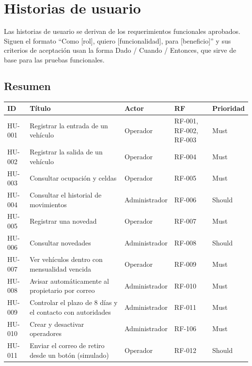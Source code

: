 
\chapter{Historias de usuario}\label{cap:historias}

Las historias de usuario se derivan de los requerimientos funcionales aprobados. Siguen el formato ``Como [rol], quiero [funcionalidad], para [beneficio]'' y sus criterios de aceptación usan la forma Dado / Cuando / Entonces, que sirve de base para las pruebas funcionales.

\section{Resumen}
\begin{longtable}{>{\raggedright\arraybackslash}p{1.5cm}>{\raggedright\arraybackslash}p{5.2cm}>{\raggedright\arraybackslash}p{2.6cm}>{\raggedright\arraybackslash}p{3.0cm}>{\raggedright\arraybackslash}p{1.9cm}}
\toprule
\textbf{ID} & \textbf{Título} & \textbf{Actor} & \textbf{RF} & \textbf{Prioridad}\\
\midrule\endhead
HU-001 & Registrar la entrada de un vehículo & Operador & RF-001, RF-002, RF-003 & Must\\
HU-002 & Registrar la salida de un vehículo & Operador & RF-004 & Must\\
HU-003 & Consultar ocupación y celdas & Operador & RF-005 & Must\\
HU-004 & Consultar el historial de movimientos & Administrador & RF-006 & Should\\
HU-005 & Registrar una novedad & Operador & RF-007 & Must\\
HU-006 & Consultar novedades & Administrador & RF-008 & Should\\
HU-007 & Ver vehículos dentro con mensualidad vencida & Operador & RF-009 & Must\\
HU-008 & Avisar automáticamente al propietario por correo & Administrador & RF-010 & Must\\
HU-009 & Controlar el plazo de 8 días y el contacto con autoridades & Administrador & RF-011 & Must\\
HU-010 & Crear y desactivar operadores & Administrador & RF-106 & Must\\
HU-011 & Enviar el correo de retiro desde un botón (simulado) & Operador & RF-012 & Should\\
\bottomrule
\end{longtable}

